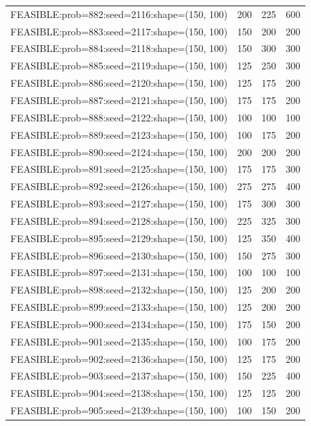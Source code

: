 \begin{longtable}{lccc}
FEASIBLE:prob=882:seed=2116:shape=(150, 100) &  200 &   225 &    600 \\
FEASIBLE:prob=883:seed=2117:shape=(150, 100) &  150 &   200 &    200 \\
FEASIBLE:prob=884:seed=2118:shape=(150, 100) &  150 &   300 &    300 \\
FEASIBLE:prob=885:seed=2119:shape=(150, 100) &  125 &   250 &    300 \\
FEASIBLE:prob=886:seed=2120:shape=(150, 100) &  125 &   175 &    200 \\
FEASIBLE:prob=887:seed=2121:shape=(150, 100) &  175 &   175 &    200 \\
FEASIBLE:prob=888:seed=2122:shape=(150, 100) &  100 &   100 &    100 \\
FEASIBLE:prob=889:seed=2123:shape=(150, 100) &  100 &   175 &    200 \\
FEASIBLE:prob=890:seed=2124:shape=(150, 100) &  200 &   200 &    200 \\
FEASIBLE:prob=891:seed=2125:shape=(150, 100) &  175 &   175 &    300 \\
FEASIBLE:prob=892:seed=2126:shape=(150, 100) &  275 &   275 &    400 \\
FEASIBLE:prob=893:seed=2127:shape=(150, 100) &  175 &   300 &    300 \\
FEASIBLE:prob=894:seed=2128:shape=(150, 100) &  225 &   325 &    300 \\
FEASIBLE:prob=895:seed=2129:shape=(150, 100) &  125 &   350 &    400 \\
FEASIBLE:prob=896:seed=2130:shape=(150, 100) &  150 &   275 &    300 \\
FEASIBLE:prob=897:seed=2131:shape=(150, 100) &  100 &   100 &    100 \\
FEASIBLE:prob=898:seed=2132:shape=(150, 100) &  125 &   200 &    200 \\
FEASIBLE:prob=899:seed=2133:shape=(150, 100) &  125 &   200 &    200 \\
FEASIBLE:prob=900:seed=2134:shape=(150, 100) &  175 &   150 &    200 \\
FEASIBLE:prob=901:seed=2135:shape=(150, 100) &  100 &   175 &    200 \\
FEASIBLE:prob=902:seed=2136:shape=(150, 100) &  125 &   175 &    200 \\
FEASIBLE:prob=903:seed=2137:shape=(150, 100) &  150 &   225 &    400 \\
FEASIBLE:prob=904:seed=2138:shape=(150, 100) &  125 &   125 &    200 \\
FEASIBLE:prob=905:seed=2139:shape=(150, 100) &  100 &   150 &    200 \\

\end{longtable}
